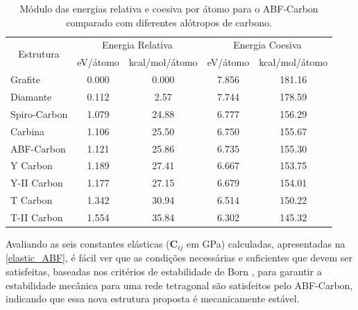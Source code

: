		\begin{table}[ht]
			\centering
			\renewcommand{\arraystretch}{1.1}
			\caption{Módulo das energias relativa e coesiva por átomo para o ABF-Carbon comparado com diferentes alótropos de carbono.}
			\label{energy-abf}
			\begin{tabular}{lcccc}
				\hline
				\hline
				\multicolumn{1}{c}{\multirow{2}{*}{Estrutura}} & \multicolumn{2}{c}{Energia Relativa} & \multicolumn{2}{c}{Energia Coesiva}                             \\ \cline{2-5} 
				\multicolumn{1}{c}{}                           & \multicolumn{1}{l}{eV/átomo} & \multicolumn{1}{l}{kcal/mol/átomo} & \multicolumn{1}{l}{eV/átomo} & \multicolumn{1}{l}{kcal/mol/átomo} \\ \hline
				Grafite      & 0.000  & 0.000  & 7.856  & 181.16  \\
				Diamante     & 0.112  & 2.57   & 7.744  & 178.59  \\
				Spiro-Carbon & 1.079  & 24.88  & 6.777  & 156.29  \\
				Carbina      & 1.106  & 25.50  & 6.750  & 155.67  \\
				ABF-Carbon   & 1.121  & 25.86  & 6.735  & 155.30  \\
				Y Carbon     & 1.189  & 27.41  & 6.667  & 153.75  \\
				Y-II Carbon  & 1.177  & 27.15  & 6.679  & 154.01  \\
				T Carbon     & 1.342  & 30.94  & 6.514  & 150.22  \\
				T-II Carbon  & 1.554  & 35.84  & 6.302  & 145.32  \\ \hline \hline
			\end{tabular}
		\end{table}
		
		
		Avaliando as seis constantes elásticas ($\textbf{C}_{ij}$ em GPa) calculadas, apresentadas na \autoref{elastic_ABF}, é fácil ver que as condições necessárias e suficientes que devem ser satisfeitas, baseadas nos critérios de estabilidade de Born \cite{born1940stability}, para garantir a estabilidade mecânica para uma rede tetragonal são satisfeitos pelo ABF-Carbon, indicando que essa nova estrutura proposta é mecanicamente estável. 
		
